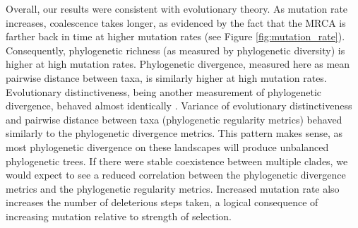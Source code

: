\documentclass[letterpaper]{article}
\begin{document}
Overall, our results were consistent with %
evolutionary theory. %
As mutation rate increases, coalescence takes longer, as evidenced by the fact that the MRCA is farther back in time at higher mutation rates (see Figure \ref{fig:mutation_rate}). Consequently, phylogenetic richness (as measured by phylogenetic diversity) is higher at high mutation rates. Phylogenetic divergence, measured here as mean pairwise distance between taxa, is similarly higher at high mutation rates. Evolutionary distinctiveness, being another measurement of phylogenetic divergence, behaved almost identically \citep{supplement}. Variance of evolutionary distinctiveness and pairwise distance between taxa (phylogenetic regularity metrics) behaved similarly to the phylogenetic divergence metrics. This pattern makes sense, as most phylogenetic divergence on these landscapes will produce unbalanced phylogenetic trees. If there were stable coexistence between multiple clades, we would expect to see a reduced correlation between the phylogenetic divergence metrics and the phylogenetic regularity metrics. Increased mutation rate also increases the number of deleterious steps taken, a logical consequence of increasing mutation relative to strength of selection.
\end{document}
